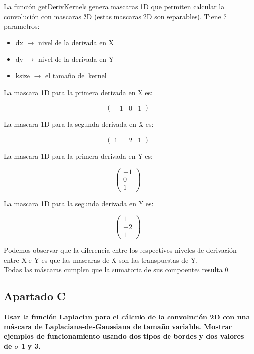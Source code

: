 \documentclass{article}
\begin{document}
La función getDerivKernels genera mascaras 1D que permiten calcular la convolución con mascaras 2D (estas mascaras 2D son separables). Tiene 3 parametros:
\begin{itemize}
\item dx $\rightarrow$ nivel de la derivada en X 
\item dy $\rightarrow$ nivel de la derivada en Y
\item ksize $\rightarrow$ el tamaño del kernel
\end{itemize}

La mascara 1D para la primera derivada en X es:
\begin{center}
$$
\begin{pmatrix}
-1 & 0 & 1
\end{pmatrix}
$$
\end{center}

La mascara 1D para la segunda derivada en X es:
\begin{center}
$$
\begin{pmatrix}
1 & -2 & 1
\end{pmatrix}
$$
\end{center}

La mascara 1D para la primera derivada en Y es:
\begin{center}
$$
\begin{pmatrix}
-1 \\
0 \\
1
\end{pmatrix}
$$
\end{center}

La mascara 1D para la segunda derivada en Y es:
\begin{center}
$$
\begin{pmatrix}
1  \\
-2 \\
1
\end{pmatrix}
$$
\end{center}

Podemos observar que la diferencia entre los respectivos niveles de derivación entre X e Y es que las mascaras de X son las transpuestas de Y.
\\

Todas las máscaras cumplen que la sumatoria de sus compoentes resulta 0.



\subsection*{Apartado C}
\textbf{Usar la función Laplacian para el cálculo de la convolución 2D con una máscara de Laplaciana-de-Gaussiana de tamaño variable. Mostrar ejemplos de funcionamiento usando dos tipos de bordes y dos valores de $\sigma$ 1 y 3.}
\end{document}
